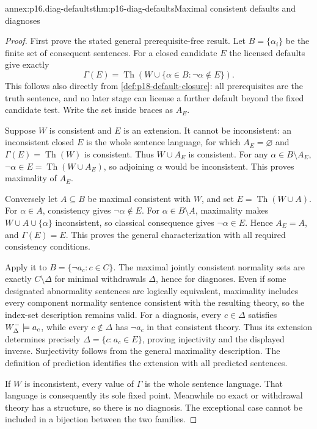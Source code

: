 \begin{annexitem}{annex:p16.diag-defaults}{thm:p16-diag-defaults}{Maximal consistent defaults and diagnoses}
\begin{proof}
First prove the stated general prerequisite-free
result. Let \(B=\{\alpha_i\}\) be the finite
set of consequent sentences. For a closed candidate
\(E\) the licensed defaults give exactly
\[
 \Gamma(E)=\operatorname{Th}
       (W\cup\{\alpha\in B:\neg\alpha\notin E\}).
\]
This follows also directly from
\cref{def:p18-default-closure}: all prerequisites
are the truth sentence, and no later stage can
license a further default beyond the fixed
candidate test. Write the set inside braces as
\(A_E\).

Suppose \(W\) is consistent and \(E\) is an
extension. It cannot be inconsistent: an
inconsistent closed \(E\) is the whole sentence
language, for which \(A_E=\varnothing\) and
\(\Gamma(E)=\operatorname{Th}(W)\) is consistent.
Thus \(W\cup A_E\) is consistent.
For any \(\alpha\in B\setminus A_E\),
\(\neg\alpha\in E=\operatorname{Th}(W\cup A_E)\),
so adjoining \(\alpha\) would be inconsistent.
This proves maximality of \(A_E\).

Conversely let \(A\subseteq B\) be maximal
consistent with \(W\), and set
\(E=\operatorname{Th}(W\cup A)\).
For \(\alpha\in A\), consistency gives
\(\neg\alpha\notin E\). For
\(\alpha\in B\setminus A\), maximality makes
\(W\cup A\cup\{\alpha\}\) inconsistent,
so classical consequence gives
\(\neg\alpha\in E\). Hence \(A_E=A\),
and \(\Gamma(E)=E\). This proves the general
characterization with all required consistency
conditions.

Apply it to \(B=\{\neg a_c:c\in C\}\).
The maximal jointly consistent normality sets
are exactly \(C\setminus\Delta\) for minimal
withdrawals \(\Delta\), hence for diagnoses.
Even if some designated abnormality sentences
are logically equivalent, maximality includes
every component normality sentence consistent
with the resulting theory, so the index-set
description remains valid.
For a diagnosis, every \(c\in\Delta\) satisfies
\(W^-_\Delta\models a_c\), while every
\(c\notin\Delta\) has \(\neg a_c\) in that
consistent theory. Thus its extension determines
precisely \(\Delta=\{c:a_c\in E\}\), proving
injectivity and the displayed inverse. Surjectivity
follows from the general maximality description.
The definition of prediction identifies the
extension with all predicted sentences.

If \(W\) is inconsistent, every value of
\(\Gamma\) is the whole sentence language.
That language is consequently its sole fixed
point. Meanwhile no exact or withdrawal theory
has a structure, so there is no diagnosis.
The exceptional case cannot be included in a
bijection between the two families.
\end{proof}
\end{annexitem}

